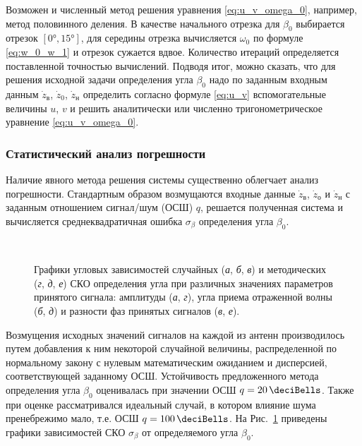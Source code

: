 \documentclass[../main.tex]{subfiles}
\begin{document}
Возможен и численный метод решения уравнения \eqref{eq:u_v_omega_0}, например, метод половинного деления. В качестве начального отрезка для $\beta_0$ выбирается отрезок $[\ang{0}, \ang{15}]$, для середины отрезка вычисляется  $\omega_0$ по формуле \eqref{eq:w_0_w_1} и отрезок сужается вдвое. Количество итераций определяется поставленной точностью вычислений. Подводя итог, можно сказать, что для решения исходной задачи определения угла $\beta_0$ надо по заданным входным данным $\dot{z}_\text{в}$, $\dot{z}_{0}$, $\dot{z}_\text{н}$ определить согласно формуле \eqref{eq:u_v} вспомогательные величины $u$, $v$ и решить аналитически или численно тригонометрическое уравнение \eqref{eq:u_v_omega_0}.

\subsubsection{Статистический анализ погрешности}

Наличие явного метода решения системы существенно облегчает анализ погрешности. Стандартным образом возмущаются входные данные $\dot{z}_\text{в}$, $\dot{z}_{о}$ и $\dot{z}_\text{н}$ с заданным отношением сигнал/шум (ОСШ) $q$, решается полученная система и вычисляется среднеквадратичная ошибка $\sigma_\beta$ определения угла $\beta_0$.

\begin{figure}[htpb]
  \centering
  \\

  \caption{Графики угловых зависимостей случайных (\textit{а}, \textit{б}, \textit{в}) и методических (\textit{г}, \textit{д}, \textit{е}) СКО определения угла при различных значениях параметров принятого сигнала: амплитуды (\textit{а}, \textit{г}), угла приема отраженной волны (\textit{б}, \textit{д}) и разности фаз принятых сигналов (\textit{в}, \textit{е}).}
  \label{fig:surface:pic2}
\end{figure}

Возмущения исходных значений сигналов на каждой из антенн производилось путем добавления к ним некоторой случайной величины, распределенной по нормальному закону с нулевым математическим ожиданием и дисперсией, соответствующей заданному ОСШ. Устойчивость предложенного метода определения угла $\beta_0$ оценивалась при значении ОСШ $q = \SI{20}{\deciBells}$. Также при оценке рассматривался идеальный случай, в котором влияние шума пренебрежимо мало, т.е. ОСШ $q = \SI{100}{\deciBells}$. На Рис.~\ref{fig:surface:pic2} приведены графики зависимостей СКО $\sigma_\beta$ от определяемого угла $\beta_0$.
\end{document}
